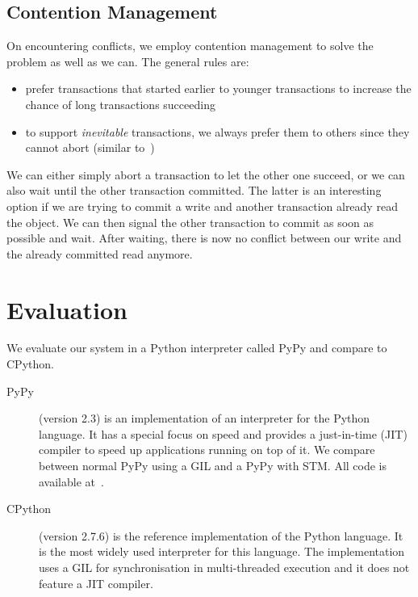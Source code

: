 \documentclass{sigplanconf}
\begin{document}
\subsection{Contention Management\label{subsub:contentionmanagement}}

On encountering conflicts, we employ contention management to solve
the problem as well as we can. The general rules are:

\begin{itemize}
\item prefer transactions that started earlier to younger transactions
  to increase the chance of long transactions succeeding
\item to support \emph{inevitable} transactions, we always prefer them
  to others since they cannot abort (similar to~\cite{blundell06})
\end{itemize}

We can either simply abort a transaction to let the other one succeed,
or we can also wait until the other transaction committed. The latter
is an interesting option if we are trying to commit a write and
another transaction already read the object. We can then signal the
other transaction to commit as soon as possible and wait. After
waiting, there is now no conflict between our write and the already
committed read anymore.



\section{Evaluation}

We evaluate our system in a Python interpreter called
PyPy and compare to CPython.
\begin{description}
\item[PyPy] (version 2.3) is an implementation of an
  interpreter for the Python language. It has a special focus on speed
  and provides a just-in-time (JIT) compiler to speed up applications
  running on top of it. We compare between normal PyPy
  using a GIL and a PyPy with STM. All code is available at~\cite{pypy}.
\item[CPython] (version 2.7.6) is the reference implementation of the Python
  language. It is the most widely used interpreter for this language.
  The implementation uses a GIL for synchronisation in multi-threaded
  execution and it does not feature a JIT compiler.
\end{description}
\end{document}
